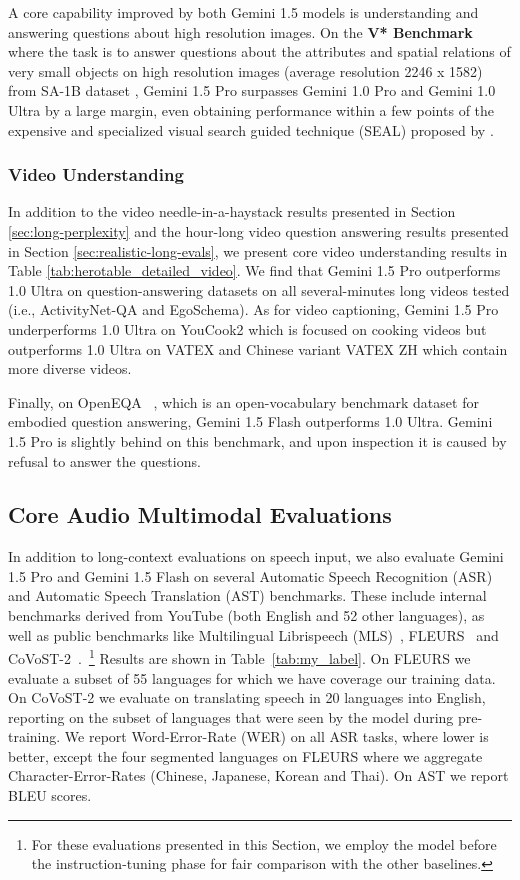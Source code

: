 A core capability improved  by both Gemini 1.5 models is understanding and answering questions about high resolution images. On the \textbf{V* Benchmark} \cite{vstar} where the task is to answer questions about the attributes and spatial relations of very small objects on high resolution images (average resolution 2246 x 1582) from SA-1B dataset \cite{kirillov2023segment}, Gemini 1.5 Pro surpasses  Gemini 1.0 Pro and Gemini 1.0 Ultra by a large margin, even obtaining performance within a few points of the expensive and specialized visual search guided technique (SEAL) proposed by \cite{vstar}.

\subsubsection{Video Understanding}
\label{sec:video_understanding}

In addition to the video needle-in-a-haystack results presented in Section \ref{sec:long-perplexity} and the hour-long video question answering results presented in Section \ref{sec:realistic-long-evals}, we present core video understanding results in Table \ref{tab:herotable_detailed_video}.
We find that Gemini 1.5 Pro outperforms 1.0 Ultra on question-answering datasets on all several-minutes long videos tested (i.e., ActivityNet-QA and EgoSchema). As for video captioning, Gemini 1.5 Pro underperforms 1.0 Ultra on YouCook2 which is focused on cooking videos but outperforms 1.0 Ultra on VATEX and Chinese variant VATEX ZH which contain more diverse videos.

Finally, on OpenEQA~ \cite{majumdar2024openeqa}, which is an open-vocabulary benchmark dataset for embodied question answering, Gemini 1.5 Flash outperforms 1.0 Ultra. Gemini 1.5 Pro is slightly behind on this benchmark, and upon inspection it is caused by refusal to answer the questions.

\subsection{Core Audio Multimodal Evaluations}

In addition to long-context evaluations on speech input, we also evaluate Gemini 1.5 Pro and Gemini 1.5 Flash on several Automatic Speech Recognition (ASR) and Automatic Speech Translation (AST) benchmarks. These include internal benchmarks derived from YouTube (both English and 52 other languages), as well as public benchmarks like Multilingual Librispeech (MLS)~\cite{pratap2020mls}, FLEURS~\cite{conneau2023fleurs} and CoVoST-2~\cite{wang2020covost}.~\footnote{For these evaluations presented in this Section, we employ the model before the instruction-tuning phase for fair comparison with the other baselines.} Results are shown in Table~\ref{tab:my_label}. On FLEURS we evaluate a subset of 55 languages for which we have coverage our training data. On CoVoST-2 we evaluate on translating speech in 20 languages into English, reporting on the subset of languages that were seen by the model during pre-training. We report Word-Error-Rate (WER) on all ASR tasks, where lower is better, except the four segmented languages on FLEURS where we aggregate Character-Error-Rates (Chinese, Japanese, Korean and Thai). On AST we report BLEU scores.

